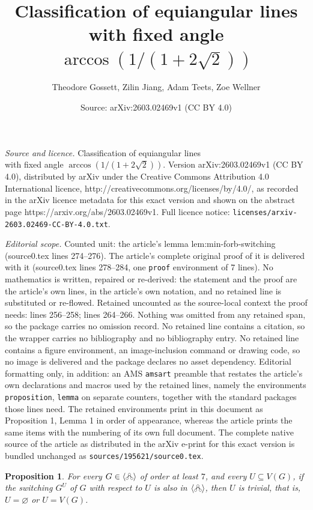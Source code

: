 \documentclass[10pt,a4paper]{amsart}
\title{Classification of equiangular lines\\with fixed angle $\arccos(1/(1+2\sqrt2))$}
\author{Theodore Gossett, Zilin Jiang, Adam Teets, Zoe Wellner}
\date{Source: arXiv:2603.02469v1 (CC BY 4.0)}
\newtheorem{proposition}{Proposition}
\newcommand{\cherry}{\tikz[baseline=-0.15ex]{\draw[darkgray, thick] (0,0)--(0.1,0.17320508075)--(0.2,0); \draw[darkgray, fill=white] (0,0) circle (0.05); \draw[darkgray, fill=white] (0.1,0.17320508075) circle (0.05); \draw[darkgray, fill=white] (0.2,0) circle (0.05);}}
\newcommand{\cl}[1]{\langle #1 \rangle}
\begin{document}
\maketitle

\noindent\emph{Source and licence.} Classification of equiangular lines\\with fixed angle $\arccos(1/(1+2\sqrt2))$. Version arXiv:2603.02469v1 (CC BY 4.0), distributed by arXiv under the Creative Commons Attribution 4.0 International licence, http://creativecommons.org/licenses/by/4.0/, as recorded in the arXiv licence metadata for this exact version and shown on the abstract page https://arxiv.org/abs/2603.02469v1. Full licence notice: \texttt{licenses/arxiv-2603.02469-CC-BY-4.0.txt}.\par\smallskip

\noindent\textit{Editorial scope.} Counted unit: the article's lemma lem:min-forb-switching (source0.tex lines 274--276). The article's complete original proof of it is delivered with it (source0.tex lines 278--284, one \texttt{proof} environment of 7 lines). No mathematics is written, repaired or re-derived: the statement and the proof are the article's own lines, in the article's own notation, and no retained line is substituted or re-flowed.  Retained uncounted as the source-local context the proof needs: lines 256--258; lines 264--266.  Nothing was omitted from any retained span, so the package carries no omission record.  No retained line contains a citation, so the wrapper carries no bibliography and no bibliography entry.  No retained line contains a figure environment, an image-inclusion command or drawing code, so no image is delivered and the package declares no asset dependency.  Editorial formatting only, in addition: an AMS \texttt{amsart} preamble that restates the article's own declarations and macros used by the retained lines, namely the environments \texttt{proposition}, \texttt{lemma} on separate counters, together with the standard packages those lines need.  The retained environments print in this document as Proposition 1, Lemma 1 in order of appearance, whereas the article prints the same items with the numbering of its own full document.  The complete native source of the article as distributed in the arXiv e-print for this exact version is bundled unchanged as \texttt{sources/195621/source0.tex}.
\begin{proposition} \label{lem:uniq}
    For every $G \in \cl\cherry$ of order at least $7$, and every $U \subseteq V(G)$, if the switching $G^U$ of $G$ with respect to $U$ is also in $\cl\cherry$, then $U$ is trivial, that is, $U = \varnothing$ or $U = V(G)$.
\end{proposition}
\end{document}
